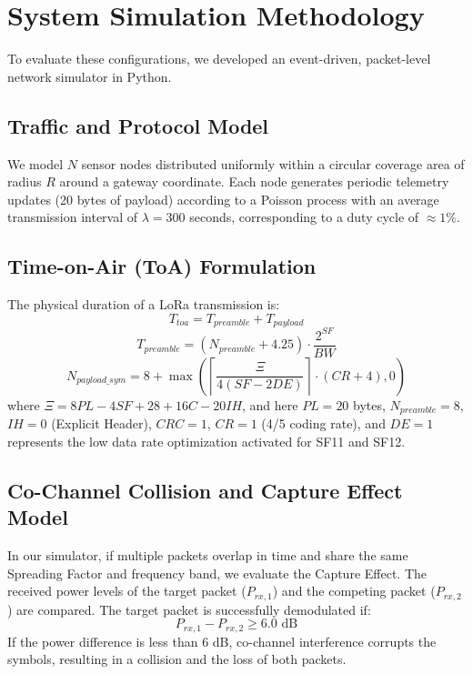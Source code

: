 \documentclass[journal,10pt,doublecolumn]{IEEEtran}
\begin{document}
\section{System Simulation Methodology}
\label{sec:simulation}
To evaluate these configurations, we developed an event-driven, packet-level network simulator in Python.

\subsection{Traffic and Protocol Model}
We model $N$ sensor nodes distributed uniformly within a circular coverage area of radius $R$ around a gateway coordinate. Each node generates periodic telemetry updates (20 bytes of payload) according to a Poisson process with an average transmission interval of $\lambda = 300$ seconds, corresponding to a duty cycle of $\approx 1\%$. 

\subsection{Time-on-Air (ToA) Formulation}
The physical duration of a LoRa transmission is:
\begin{equation}
    T_{toa} = T_{preamble} + T_{payload}
\end{equation}
\begin{equation}
    T_{preamble} = (N_{preamble} + 4.25) \cdot \frac{2^{SF}}{BW}
\end{equation}
\begin{equation}
    N_{payload\_sym} = 8 + \max\left( \left\lceil \frac{\Xi}{4(SF - 2DE)} \right\rceil \cdot (CR + 4), 0 \right)
\end{equation}
where $\Xi = 8PL - 4SF + 28 + 16C - 20IH$, and here $PL = 20$ bytes, $N_{preamble} = 8$, $IH = 0$ (Explicit Header), $CRC = 1$, $CR = 1$ (4/5 coding rate), and $DE = 1$ represents the low data rate optimization activated for SF11 and SF12.

\subsection{Co-Channel Collision and Capture Effect Model}
In our simulator, if multiple packets overlap in time and share the same Spreading Factor and frequency band, we evaluate the Capture Effect. The received power levels of the target packet ($P_{rx,1}$) and the competing packet ($P_{rx,2}$) are compared. The target packet is successfully demodulated if:
\begin{equation}
    P_{rx,1} - P_{rx,2} \ge 6.0 \text{ dB}
\end{equation}
If the power difference is less than 6 dB, co-channel interference corrupts the symbols, resulting in a collision and the loss of both packets.
\end{document}
